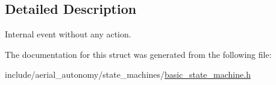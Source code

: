 \subsection{Detailed Description}
Internal event without any action. 

The documentation for this struct was generated from the following file\-:\begin{DoxyCompactItemize}
\item 
include/aerial\-\_\-autonomy/state\-\_\-machines/\hyperlink{basic__state__machine_8h}{basic\-\_\-state\-\_\-machine.\-h}\end{DoxyCompactItemize}
